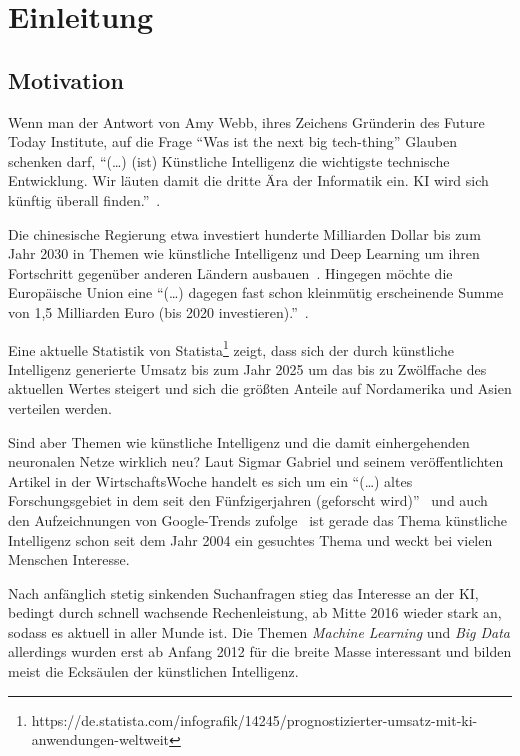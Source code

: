 \chapter{Einleitung}
\label{ch:einleitung}

\section{Motivation}
\label{sec:motivation}
Wenn man der Antwort von Amy Webb, ihres Zeichens Gründerin des Future Today Institute, auf die Frage \enquote{Was ist
the next big tech-thing} Glauben schenken darf, \enquote{(\ldots) (ist) Künstliche Intelligenz die wichtigste technische
Entwicklung. Wir läuten damit die dritte Ära der Informatik ein. KI wird sich künftig überall
finden.}~\cite{article_einleitung_dub_aw}.

Die chinesische Regierung etwa investiert hunderte Milliarden Dollar bis zum Jahr 2030 in Themen wie künstliche
Intelligenz und Deep Learning um ihren Fortschritt gegenüber anderen Ländern ausbauen~\cite{article_einleitung_css}.
Hingegen möchte die Europäische Union eine \enquote{(\ldots) dagegen fast schon kleinmütig erscheinende Summe von 1,5
Milliarden Euro (bis 2020 investieren).}~\cite{article_einleitung_ww_sg}.

Eine aktuelle Statistik von
Statista\footnote{https://de.statista.com/infografik/14245/prognostizierter-umsatz-mit-ki-anwendungen-weltweit} zeigt,
dass sich der durch künstliche Intelligenz generierte Umsatz bis zum Jahr 2025 um das bis zu Zwölffache des aktuellen
Wertes steigert und sich die größten Anteile auf Nordamerika und Asien verteilen werden.

Sind aber Themen wie künstliche Intelligenz und die damit einhergehenden neuronalen Netze wirklich neu? Laut Sigmar
Gabriel und seinem veröffentlichten Artikel in der WirtschaftsWoche handelt es sich um ein \enquote{(\ldots) altes
Forschungsgebiet in dem seit den Fünfzigerjahren (geforscht wird)}~\cite{article_einleitung_ww_sg} und auch den
Aufzeichnungen von Google-Trends zufolge~\cite{online_einleitung_googletrends} ist gerade das Thema künstliche
Intelligenz schon seit dem Jahr 2004 ein gesuchtes Thema und weckt bei vielen Menschen Interesse.

Nach anfänglich stetig sinkenden Suchanfragen stieg das Interesse an der KI, bedingt durch schnell wachsende
Rechenleistung, ab Mitte 2016 wieder stark an, sodass es aktuell in aller Munde ist. Die Themen
\textit{Machine Learning} und \textit{Big Data} allerdings wurden erst ab Anfang 2012 für die breite Masse interessant
und bilden meist die Ecksäulen der künstlichen Intelligenz.

